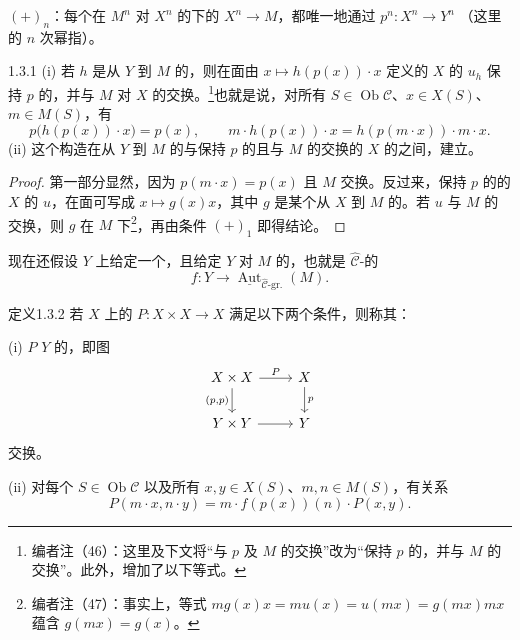 $(+)_n$：每个在 $M^n$ 对 $X^n$ 的下的 $X^n\to M$，都唯一地通过 $p^n:X^n\to Y^n$ （这里的 $n$ 次幂指）。
\begin{SGAresult}{}{1.3.1}
(i) 若 $h$ 是从 $Y$ 到 $M$ 的，则在面由 $x\mapsto h(p(x))\cdot x$ 定义的 $X$ 的 $u_h$ 保持 $p$ 的，并与 $M$ 对 $X$ 的交换。\footnote{编者注（46）：这里及下文将“与 $p$ 及 $M$ 的交换”改为“保持 $p$ 的，并与 $M$ 的交换”。此外，增加了以下等式。}也就是说，对所有 $S\in\operatorname{Ob}\mathcal C$、$x\in X(S)$、$m\in M(S)$，有
\[
 p\bigl(h(p(x))\cdot x\bigr)=p(x),\qquad
 m\cdot h(p(x))\cdot x=h(p(m\cdot x))\cdot m\cdot x.
\]
(ii) 这个构造在从 $Y$ 到 $M$ 的与保持 $p$ 的且与 $M$ 的交换的 $X$ 的之间，建立。
\end{SGAresult}
\begin{proof}
第一部分显然，因为 $p(m\cdot x)=p(x)$ 且 $M$ 交换。反过来，保持 $p$ 的的 $X$ 的 $u$，在面可写成 $x\mapsto g(x)x$，其中 $g$ 是某个从 $X$ 到 $M$ 的。若 $u$ 与 $M$ 的交换，则 $g$ 在 $M$ 下\footnote{编者注（47）：事实上，等式 $mg(x)x=mu(x)=u(mx)=g(mx)mx$ 蕴含 $g(mx)=g(x)$。}，再由条件 $(+)_1$ 即得结论。
\end{proof}
现在还假设 $Y$ 上给定一个，且给定 $Y$ 对 $M$ 的，也就是 $\widehat{\mathcal C}$-的
\[
 f:Y\longrightarrow\underline{\operatorname{Aut}}_{\widehat{\mathcal C}\text{-gr.}}(M). \tag{$\ddagger$}
\]
\begin{SGAresult}{定义}{1.3.2}
若 $X$ 上的 $P:X\times X\to X$ 满足以下两个条件，则称其：

(i) $P$  $Y$ 的，即图
\[
\begin{tikzcd}
 X\times X\arrow[r,"P"]\arrow[d,"{(p,p)}"']&X\arrow[d,"p"]\\
 Y\times Y\arrow[r]&Y
\end{tikzcd}
\]
交换。

(ii) 对每个 $S\in\operatorname{Ob}\mathcal C$ 以及所有 $x,y\in X(S)$、$m,n\in M(S)$，有关系
\[
 P(m\cdot x,n\cdot y)=m\cdot f(p(x))(n)\cdot P(x,y). \tag{++}
\]
\end{SGAresult}
